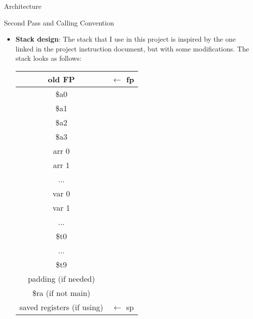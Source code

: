 \documentclass[letterpaper,12pt]{article}
\theoremstyle{definition}
\begin{document}
\begin{section}{Architecture}
        \begin{subsection}{Second Pass and Calling Convention}
            \begin{itemize}
                \item \textbf{Stack design}: The stack that I use in this project is inspired by the one linked in the project instruction document, but with some modifications. The stack looks as follows:
                    \begin{center}
                        \begin{tabular}{| c | c |}
                            \hline
                            old FP & \(\leftarrow\) fp \\
                            \hline
                            \$a0 & \\
                            \hline
                            \$a1 & \\
                            \hline
                            \$a2 & \\
                            \hline
                            \$a3 & \\
                            \hline
                            arr 0 & \\
                            \hline
                            arr 1 & \\
                            \hline
                            ... & \\
                            \hline
                            var 0 & \\
                            \hline
                            var 1 & \\
                            \hline
                            ... & \\
                            \hline
                            \$t0 & \\
                            \hline
                            ... & \\
                            \hline 
                            \$t9 & \\
                            \hline
                            padding (if needed) & \\
                            \hline
                            \$ra (if not main) & \\
                            \hline
                            saved registers (if using) & \(\leftarrow\) sp \\
                            \hline

\end{tabular}
\end{center}
\end{itemize}
\end{subsection}
\end{section}
\end{document}

